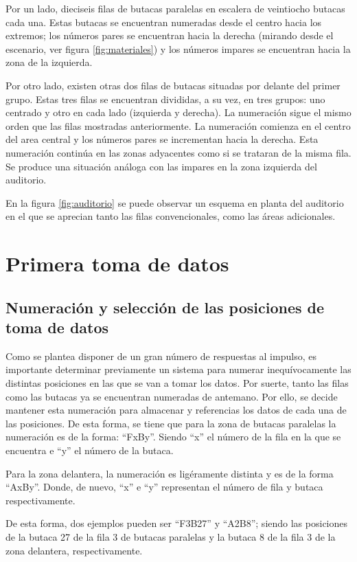 \documentclass[11pt,a4paper]{book}
\begin{document}
 			Por un lado, dieciseis filas de butacas paralelas en escalera de veintiocho butacas cada una. Estas butacas se encuentran numeradas desde el centro hacia los extremos; los números pares se encuentran hacia la derecha (mirando desde el escenario, ver figura \ref{fig:materiales}) y los números impares se encuentran hacia la zona de la izquierda.
 
 			Por otro lado, existen otras dos filas de butacas situadas por delante del primer grupo. Estas tres filas se encuentran divididas, a su vez, en tres grupos: uno centrado y otro en cada lado (izquierda y derecha). La numeración sigue el mismo orden que las filas mostradas anteriormente. La numeración comienza en el centro del area central y los números pares se incrementan hacia la derecha. Esta numeración continúa en las zonas adyacentes como si se trataran de la misma fila. Se produce una situación análoga con las impares en la zona izquierda del auditorio.
 
 			En la figura \ref{fig:auditorio} se puede observar un esquema en planta del auditorio en el que se aprecian tanto las filas convencionales, como las áreas adicionales.
			
			
    \section{Primera toma de datos}
	    \subsection{Numeración y selección de las posiciones de toma de datos}
		    Como se plantea disponer de un gran número de respuestas al impulso, es importante determinar previamente un sistema para numerar inequívocamente las distintas posiciones en las que se van a tomar los datos. Por suerte, tanto las filas como las butacas ya se encuentran numeradas de antemano. Por ello, se decide mantener esta numeración para almacenar y referencias los datos de cada una de las posiciones. De esta forma, se tiene que para la zona de butacas paralelas la numeración es de la forma: ``FxBy''. Siendo ``x'' el número de la fila en la que se encuentra e ``y'' el número de la butaca.

		    Para la zona delantera, la numeración es ligéramente distinta y es de la forma ``AxBy''. Donde, de nuevo, ``x'' e ``y'' representan el número de fila y butaca respectivamente.

		    De esta forma, dos ejemplos pueden ser ``F3B27'' y ``A2B8''; siendo las posiciones de la butaca 27 de la fila 3 de butacas paralelas y la butaca 8 de la fila 3 de la zona delantera, respectivamente.
\end{document}
